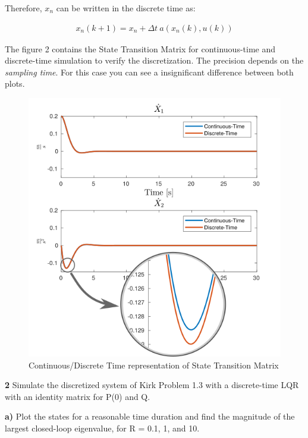 \documentclass{article}
\begin{document}
Therefore, $x_n$ can be written in the discrete time as:

\begin{eqnarray}
	x_n(k+1) = x_n + \Delta t\: a(x_n(k), u(k))
\end{eqnarray}

The figure 2 contains the State Transition Matrix for continuous-time and discrete-time simulation to verify the discretization. The precision depends on the \textit{sampling time}. For this case you can see a insignificant difference between both plots.

\begin{center} \begin{figure} 
\includegraphics [width=4.5in]{plot1.png}
\caption{Continuous/Discrete Time representation of State Transition Matrix}
\end{figure}  \end{center}

\pagebreak
\textbf{2 } Simulate the discretized system of Kirk Problem 1.3 with a discrete-time LQR with an identity matrix for P(0) and Q.

\textbf{a) } Plot the states for a reasonable time duration and find the magnitude of the largest closed-loop eigenvalue, for R = 0.1, 1, and 10.
\end{document}
